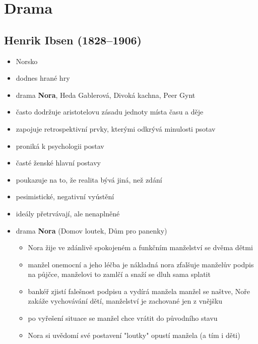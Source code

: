 \section{Drama}
\subsection{Henrik Ibsen (1828--1906)}
\begin{itemize}
\item Norsko
\item dodnes hrané hry
\item drama \textbf{Nora}, Heda Gablerová, Divoká kachna, Peer Gynt
\item často dodržuje aristotelovu zásadu jednoty místa času a děje
\item zapojuje retrospektivní prvky, kterými odkrývá minulosti psotav
\item proniká k psychologii postav
\item časté ženské hlavní postavy
\item poukazuje na to, že realita bývá jiná, než zdání
\item pesimistické, negativní vyústění
\item ideály přetrvávají, ale nenaplněné
\item drama \textbf{Nora} (Domov loutek, Dům pro panenky)
	\begin{itemize}
	\item Nora žije ve zdánlivě spokojeném a funkčním manželství se dvěma dětmi
	\item manžel onemocní a jeho léčba je nákladná \ra nora zfalšuje manželův podpis na půjčce, manželovi to zamlčí a snaží se dluh sama splatit
	\item bankéř zjistí falešnost podpisu a vydírá manžela \ra manžel se naštve, Noře zakáže vychovávání dětí, manželství je zachované jen z vnějšku
	\item po vyřešení situace se manžel chce vrátit do původního stavu
	\item Nora si uvědomí své postavení "loutky" \ra opustí manžela (a tím i děti)
	\end{itemize}


\end{itemize}
